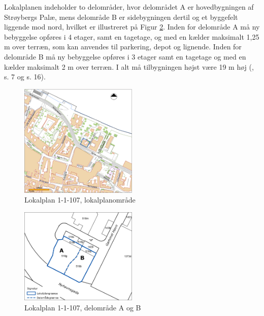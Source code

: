 \newline \indent{     }  Lokalplanen indeholder to delområder, hvor delområdet A er hovedbygningen af Strøybergs Palæ, mens delområde B er sidebygningen dertil og et byggefelt liggende mod nord, hvilket er illustreret på Figur \ref{fig:aogb}. Inden for delområde A må ny bebyggelse opføres i 4 etager, samt en tagetage, og med en kælder maksimalt 1,25 m over terræn, som kan anvendes til parkering, depot og lignende. Inden for delområde B må ny bebyggelse opføres i 3 etager samt en tagetage og med en kælder maksimalt 2 m over terræn. I alt må tilbygningen højst være 19 m høj (\citep{lokalplan}, s. 7 og s. 16).

\begin{figure}[htbp]
	\centering
	\includegraphics[width=0.5\textwidth]{billeder/nylokalplanoversigt.png}
	\caption{Lokalplan 1-1-107, lokalplanområde}
	\label{fig:1-1-107}
\end{figure}

\begin{figure}[htbp]
	\centering
	\includegraphics[width=0.5\textwidth]{billeder/tilbygning.png}
	\caption{Lokalplan 1-1-107, delområde A og B}
	\label{fig:aogb}
\end{figure}


